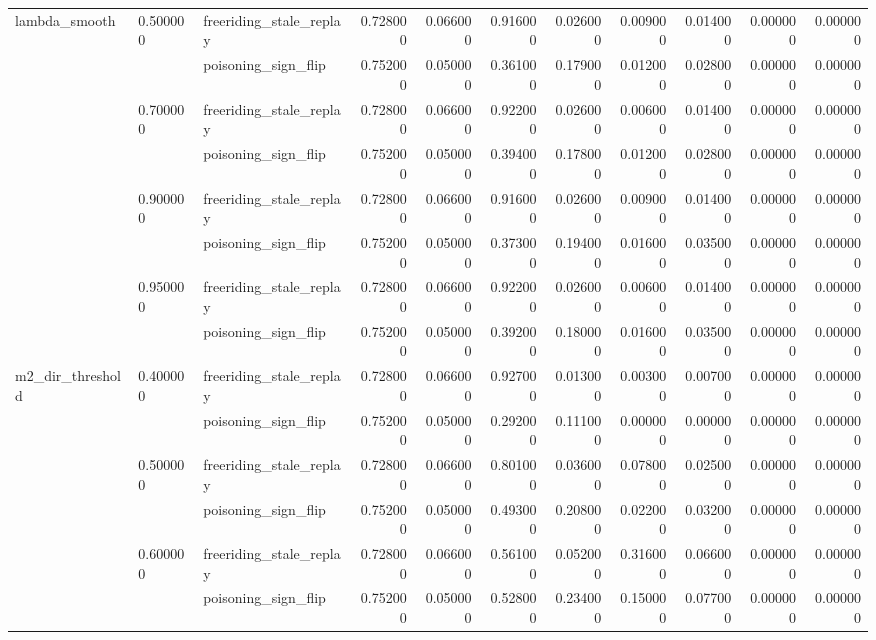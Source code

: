 \begin{tabular}{lllrrrrrrrr}
\cline{1-11} \cline{2-11}
\multirow[t]{8}{*}{lambda_smooth} & \multirow[t]{2}{*}{0.500000} & freeriding_stale_replay & 0.728000 & 0.066000 & 0.916000 & 0.026000 & 0.009000 & 0.014000 & 0.000000 & 0.000000 \\
 &  & poisoning_sign_flip & 0.752000 & 0.050000 & 0.361000 & 0.179000 & 0.012000 & 0.028000 & 0.000000 & 0.000000 \\
\cline{2-11}
 & \multirow[t]{2}{*}{0.700000} & freeriding_stale_replay & 0.728000 & 0.066000 & 0.922000 & 0.026000 & 0.006000 & 0.014000 & 0.000000 & 0.000000 \\
 &  & poisoning_sign_flip & 0.752000 & 0.050000 & 0.394000 & 0.178000 & 0.012000 & 0.028000 & 0.000000 & 0.000000 \\
\cline{2-11}
 & \multirow[t]{2}{*}{0.900000} & freeriding_stale_replay & 0.728000 & 0.066000 & 0.916000 & 0.026000 & 0.009000 & 0.014000 & 0.000000 & 0.000000 \\
 &  & poisoning_sign_flip & 0.752000 & 0.050000 & 0.373000 & 0.194000 & 0.016000 & 0.035000 & 0.000000 & 0.000000 \\
\cline{2-11}
 & \multirow[t]{2}{*}{0.950000} & freeriding_stale_replay & 0.728000 & 0.066000 & 0.922000 & 0.026000 & 0.006000 & 0.014000 & 0.000000 & 0.000000 \\
 &  & poisoning_sign_flip & 0.752000 & 0.050000 & 0.392000 & 0.180000 & 0.016000 & 0.035000 & 0.000000 & 0.000000 \\
\cline{1-11} \cline{2-11}
\multirow[t]{6}{*}{m2_dir_threshold} & \multirow[t]{2}{*}{0.400000} & freeriding_stale_replay & 0.728000 & 0.066000 & 0.927000 & 0.013000 & 0.003000 & 0.007000 & 0.000000 & 0.000000 \\
 &  & poisoning_sign_flip & 0.752000 & 0.050000 & 0.292000 & 0.111000 & 0.000000 & 0.000000 & 0.000000 & 0.000000 \\
\cline{2-11}
 & \multirow[t]{2}{*}{0.500000} & freeriding_stale_replay & 0.728000 & 0.066000 & 0.801000 & 0.036000 & 0.078000 & 0.025000 & 0.000000 & 0.000000 \\
 &  & poisoning_sign_flip & 0.752000 & 0.050000 & 0.493000 & 0.208000 & 0.022000 & 0.032000 & 0.000000 & 0.000000 \\
\cline{2-11}
 & \multirow[t]{2}{*}{0.600000} & freeriding_stale_replay & 0.728000 & 0.066000 & 0.561000 & 0.052000 & 0.316000 & 0.066000 & 0.000000 & 0.000000 \\
 &  & poisoning_sign_flip & 0.752000 & 0.050000 & 0.528000 & 0.234000 & 0.150000 & 0.077000 & 0.000000 & 0.000000 \\

\end{tabular}
